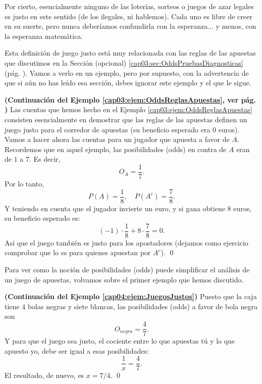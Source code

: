 Por cierto, esencialmente ninguno de las loterías, sorteos o juegos de azar legales es justo en este sentido (de los ilegales, ni hablemos). Cada uno es libre de creer en su suerte, pero nunca deberíamos confundirla con la esperanza... y menos, con la esperanza matemática.

Esta definición de juego justo está muy relacionada con las reglas de las apuestas que discutimos en la Sección (opcional) \ref{cap03:sec:OddsPruebasDiagnosticas} (pág. \pageref{cap03:sec:OddsPruebasDiagnosticas}). Vamos a verlo en un ejemplo, pero por supuesto, con la advertencia de que si aún no has leído esa sección, debes ignorar este ejemplo y el que le sigue.
\begin{ejemplo}\label{cap04:ejem:OddsReglasApuestasJuegoJusto}
{\bf (Continuación del Ejemplo \ref{cap03:ejem:OddsReglasApuestas}, ver pág. \pageref{cap03:ejem:OddsReglasApuestas})}
Las cuentas que hemos hecho en el Ejemplo \ref{cap03:ejem:OddsReglasApuestas} consisten esencialmente en demostrar que las reglas de las apuestas definen un juego justo para el corredor de apuestas (su beneficio esperado era $0$ euros). Vamos a hacer ahora las cuentas para un jugador que apuesta a favor de $A$. Recordemos que en aquel ejemplo, las posibilidades (odds) en contra de $A$ eran de $1$ a $7$. Es decir,
\[O_A=\dfrac{1}{7}.\]
Por lo tanto,
\[P(A)=\dfrac{1}{8},\quad  P(A^c)=\dfrac{7}{8}.\]
Y teniendo en cuenta que el jugador invierte un euro, y si gana obtiene $8$ euros, su beneficio esperado es:
\[(-1)\cdot\dfrac{1}{8}+8\cdot\dfrac{7}{8}=0.\]
Así que el juego también es justo para los apostadores (dejamos como ejercicio comprobar que lo es para quienes apuestan por $A^c$).
\qed
\end{ejemplo}
Para ver como la noción de posibilidades (odds) puede simplificar el análisis de un juego de apuestas, volvamos sobre el primer ejemplo que hemos discutido.
\begin{ejemplo}
\label{cap04:ejem:JuegosJustos01}
{\bf (Continuación del Ejemplo \ref{cap04:ejem:JuegosJustos})}
Puesto que la caja tiene $4$ bolas negras y siete blancas, las posibilidades (odds) a favor de bola negra son
\[O_{negra}=\dfrac{4}{7}.\]
Y para que el juego sea justo, el cociente entre lo que apuestas tú y lo que apuesto yo, debe ser igual a esas posibilidades:
\[\dfrac{1}{x}=\dfrac{4}{7}.\]
El resultado, de nuevo, es $x=7/4$.
\qed
\end{ejemplo}



